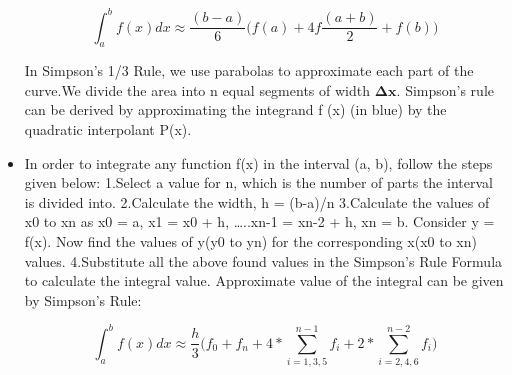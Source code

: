 \documentclass[letterpaper, 11pt]{article}
\begin{document}
\begin{itemize}
                $$\int_{a}^{b} f(x) dx \approx \frac{(b-a)}{6} \bigg(f(a) + 4f \frac{(a+b)}{2} + f(b)\bigg)$$    
                
                In Simpson’s 1/3 Rule, we use parabolas to approximate each part of the curve.We divide 
                the area into n equal segments of width $\mathbf{\Delta x}.$
                Simpson’s rule can be derived by approximating the integrand f (x) (in blue) 
                by the quadratic interpolant P(x).
                \item In order to integrate any function f(x) in the interval (a, b), follow the steps given below:
                1.Select a value for n, which is the number of parts the interval is divided into. 
                2.Calculate the width, h = (b-a)/n 
                3.Calculate the values of x0 to xn as x0 = a, x1 = x0 + h, …..xn-1 = xn-2 + h, xn = b. 
                Consider y = f(x). Now find the values of y(y0 to yn) for the corresponding x(x0 to xn) values. 
                4.Substitute all the above found values in the Simpson’s Rule Formula to calculate the integral value.
                Approximate value of the integral can be given by Simpson’s Rule: 
                
                  $$\int_{a}^{b} f(x) dx \approx \frac{h}{3} \bigg(f_0 + f_n + 4 * \sum_{i=1,3,5}^{n-1}f_i + 2* \sum_{i=2,4,6}^{n-2}f_i \bigg)$$ \cite{simpson1}   
        \end{itemize}
\end{document}
